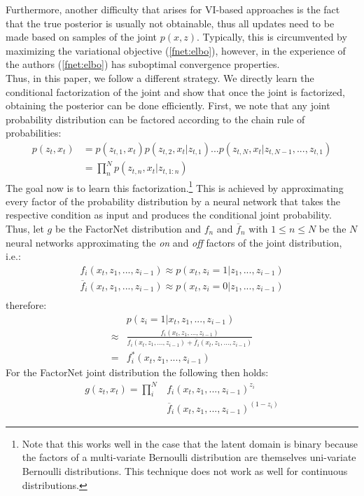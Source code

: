 Furthermore, another difficulty that arises for VI-based approaches is the fact that the true posterior is usually not obtainable, thus all updates need to be made based on samples of the joint $p(x,z)$. Typically, this is circumvented by maximizing the variational objective (\ref{fnet:elbo}), however, in the experience of the authors (\ref{fnet:elbo}) has suboptimal convergence properties.\\
Thus, in this paper, we follow a different strategy. We directly learn the conditional factorization of the joint and show that once the joint is factorized, obtaining the posterior can be done efficiently. First, we note that any joint probability distribution can be factored according to the chain rule of probabilities:
\begin{align*}
p(z_{t}, x_{t}) &= p(z_{t,1},x_t)p(z_{t,2}, x_t|z_{t,1}) ... p(z_{t,N}, x_t| z_{t,N-1}, ..., z_{t,1})\\
		    &= \prod_n^N p(z_{t,n}, x_t|z_{t,1:n})
\end{align*}
The goal now is to learn this factorization.\footnote{Note that this works well in the case that the latent domain is binary because the factors of a multi-variate Bernoulli distribution are themselves uni-variate Bernoulli distributions. This technique does not work as well for continuous distributions.} This is achieved by approximating every factor of the probability distribution by a neural network that takes the respective condition as input and produces the conditional joint probability. Thus, let $g$ be the FactorNet distribution and $f_n$ and $\overline{f}_n$ with $1 \leq n \leq N$ be the $N$ neural networks approximating the \emph{on} and \emph{off} factors of the joint distribution, i.e.:
\begin{align*}
f_i(x_t, z_1, ..., z_{i-1}) \approx p(x_t, z_{i} = 1 | z_1, ..., z_{i-1})\\
\overline{f}_i(x_t, z_1, ..., z_{i-1}) \approx p(x_t, z_{i} = 0 | z_1, ..., z_{i-1})\\
\end{align*}
therefore:
\begin{align*}
&p(z_i = 1 | x_t, z_1, ..., z_{i-1}) \\
\approx &\frac{f_i(x_t, z_1, ..., z_{i-1})}{f_i(x_t, z_1, ..., z_{i-1}) + \overline{f}_i(x_t, z_1, ..., z_{i-1})}\\
= &f^*_i(x_t, z_1, ..., z_{i-1})
\end{align*}
For the FactorNet joint distribution the following then holds:
\begin{align*}
g(z_{t}, x_{t}) = \prod_i^N &f_i(x_t, z_1, ..., z_{i-1})^{z_i} \\
			& \overline{f}_i(x_t, z_1, ..., z_{i-1})^{(1-z_i)}
\end{align*} 
